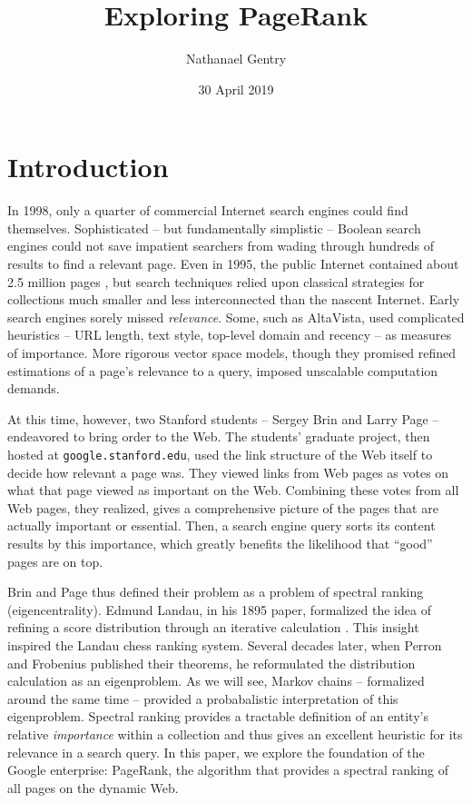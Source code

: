 \documentclass[11pt,letterpaper]{amsart}
\title{Exploring PageRank}
\author{Nathanael Gentry}
\date{30 April 2019}
\begin{document}
\maketitle



\section{Introduction}
In 1998, only a quarter of commercial Internet search engines could find
themselves. Sophisticated -- but fundamentally simplistic -- Boolean search
engines could not save impatient searchers from wading through hundreds of
results to find a relevant page. Even in 1995, the public Internet contained
about 2.5 million pages \cite{TotalNumberWebsites}, but search techniques relied
upon classical strategies for collections much smaller and less interconnected
than the nascent Internet. Early search engines sorely missed
\textit{relevance}. Some, such as AltaVista, used complicated heuristics -- URL
length, text style, top-level domain and recency -- as measures of importance.
More rigorous vector space models, though they promised refined estimations of a
page's relevance to a query, imposed unscalable computation demands.

At this time, however, two Stanford students -- Sergey Brin and Larry Page --
endeavored to bring order to the Web. The students’ graduate project, then
hosted at \texttt{google.stanford.edu}, used the link structure of the Web
itself to decide how relevant a page was. They viewed links from Web pages as
votes on what that page viewed as important on the Web. Combining these votes
from all Web pages, they realized, gives a comprehensive picture of the pages
that are actually important or essential. Then, a search engine query sorts its
content results by this importance, which greatly benefits the likelihood that
``good'' pages are on top.

Brin and Page thus defined their problem as a problem of spectral ranking
(eigencentrality). Edmund Landau, in his 1895 paper, formalized the idea of
refining a score distribution through an iterative calculation
\cite{vignaSpectralRanking2009}. This insight inspired the Landau chess ranking
system. Several decades later, when Perron and Frobenius published their
theorems, he reformulated the distribution calculation as an eigenproblem. As we
will see, Markov chains -- formalized around the same time -- provided a
probabalistic interpretation of this eigenproblem. Spectral ranking provides a
tractable definition of an entity's relative \textit{importance} within a
collection and thus gives an excellent heuristic for its relevance in a search
query. In this paper, we explore the foundation of the Google enterprise:
PageRank, the algorithm that provides a spectral ranking of all pages on the
dynamic Web.
\end{document}
